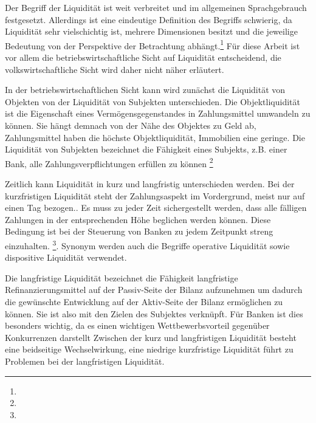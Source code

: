 Der Begriff der Liquidität ist weit verbreitet und im allgemeinen Sprachgebrauch festgesetzt. Allerdings ist eine eindeutige Definition des Begriffs schwierig, da Liquidität sehr vielschichtig ist, mehrere Dimensionen besitzt und die jeweilige Bedeutung von der Perspektive der Betrachtung abhängt.\footnote{ } Für diese Arbeit ist vor allem die betriebswirtschaftliche Sicht auf Liquidität entscheidend, die volkswirtschaftliche Sicht wird daher nicht näher erläutert.

In der betriebswirtschaftlichen Sicht kann wird zunächst die Liquidität von Objekten von der Liquidität von Subjekten unterschieden. Die Objektliquidität ist die Eigenschaft eines Vermögensgegenstandes in Zahlungsmittel umwandeln zu können. Sie hängt demnach von der Nähe des Objektes zu Geld ab, Zahlungsmittel haben die höchste Objektliquidität, Immobilien eine geringe. Die Liquidität von Subjekten bezeichnet die Fähigkeit eines Subjekts, z.B. einer Bank, alle Zahlungsverpflichtungen erfüllen zu können \footnote{ }

Zeitlich kann Liquidität in kurz und langfristig unterschieden werden. Bei der kurzfristigen Liquidität steht der Zahlungsaspekt im Vordergrund, meist nur auf einen Tag bezogen.. Es muss zu jeder Zeit sichergestellt werden, dass alle fälligen Zahlungen in der entsprechenden Höhe beglichen werden können. Diese Bedingung ist bei der Steuerung von Banken zu jedem Zeitpunkt streng einzuhalten. \footnote{ }. Synonym werden auch die Begriffe operative Liquidität sowie dispositive Liquidität verwendet.

Die langfristige Liquidität bezeichnet die Fähigkeit langfristige Refinanzierungsmittel auf der Passiv-Seite der Bilanz aufzunehmen um dadurch die gewünschte Entwicklung auf der Aktiv-Seite der Bilanz ermöglichen zu können. Sie ist also mit den Zielen des Subjektes verknüpft. Für Banken ist dies besonders wichtig, da es einen wichtigen Wettbewerbsvorteil gegenüber Konkurrenzen darstellt Zwischen der kurz und langfristigen Liquidität besteht eine beidseitige Wechselwirkung, eine niedrige kurzfristige Liquidität führt zu Problemen bei der langfristigen Liquidität.

